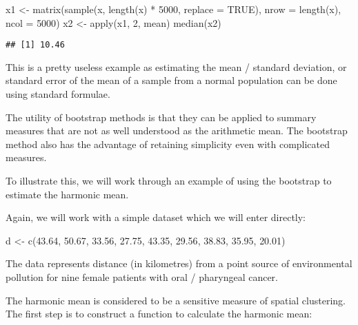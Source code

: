 \documentclass[
  12pt,
  a4paper]{book}
\newenvironment{Shaded}{\begin{snugshade}}{\end{snugshade}}
\newcommand{\AttributeTok}[1]{\textcolor[rgb]{0.77,0.63,0.00}{#1}}
\newcommand{\ConstantTok}[1]{\textcolor[rgb]{0.00,0.00,0.00}{#1}}
\newcommand{\DecValTok}[1]{\textcolor[rgb]{0.00,0.00,0.81}{#1}}
\newcommand{\FloatTok}[1]{\textcolor[rgb]{0.00,0.00,0.81}{#1}}
\newcommand{\FunctionTok}[1]{\textcolor[rgb]{0.00,0.00,0.00}{#1}}
\newcommand{\NormalTok}[1]{#1}
\newcommand{\OtherTok}[1]{\textcolor[rgb]{0.56,0.35,0.01}{#1}}
\newcommand{\SpecialCharTok}[1]{\textcolor[rgb]{0.00,0.00,0.00}{#1}}
\begin{document}
\begin{Shaded}
\begin{Highlighting}[]
\NormalTok{x1 }\OtherTok{\textless{}{-}} \FunctionTok{matrix}\NormalTok{(}\FunctionTok{sample}\NormalTok{(x, }\FunctionTok{length}\NormalTok{(x) }\SpecialCharTok{*} \DecValTok{5000}\NormalTok{, }\AttributeTok{replace =} \ConstantTok{TRUE}\NormalTok{),}
             \AttributeTok{nrow =} \FunctionTok{length}\NormalTok{(x), }\AttributeTok{ncol =} \DecValTok{5000}\NormalTok{)}
\NormalTok{x2 }\OtherTok{\textless{}{-}} \FunctionTok{apply}\NormalTok{(x1, }\DecValTok{2}\NormalTok{, mean)}
\FunctionTok{median}\NormalTok{(x2)}
\end{Highlighting}
\end{Shaded}

\begin{verbatim}
## [1] 10.46
\end{verbatim}

This is a pretty useless example as estimating the mean / standard deviation, or standard error of the mean of a sample from a normal population can be done using standard formulae.

The utility of bootstrap methods is that they can be applied to summary measures that are not as well understood as the arithmetic mean. The bootstrap method also has the advantage of retaining simplicity even with complicated measures.

To illustrate this, we will work through an example of using the bootstrap to estimate the harmonic mean.

Again, we will work with a simple dataset which we will enter directly:

\begin{Shaded}
\begin{Highlighting}[]
\NormalTok{d }\OtherTok{\textless{}{-}} \FunctionTok{c}\NormalTok{(}\FloatTok{43.64}\NormalTok{, }\FloatTok{50.67}\NormalTok{, }\FloatTok{33.56}\NormalTok{, }\FloatTok{27.75}\NormalTok{, }\FloatTok{43.35}\NormalTok{, }\FloatTok{29.56}\NormalTok{, }\FloatTok{38.83}\NormalTok{, }\FloatTok{35.95}\NormalTok{, }\FloatTok{20.01}\NormalTok{)}
\end{Highlighting}
\end{Shaded}

The data represents distance (in kilometres) from a point source of environmental pollution for nine female patients with oral / pharyngeal cancer.

The harmonic mean is considered to be a sensitive measure of spatial clustering. The first step is to construct a function to calculate the harmonic mean:
\end{document}
